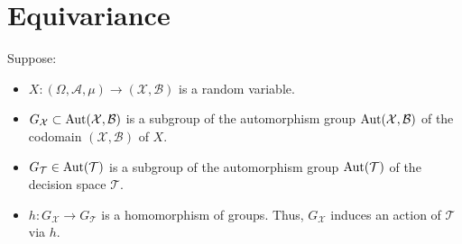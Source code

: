 
\newcommand{\Aut}{\textnormal{Aut}}

\section{Equivariance}
\setcounter{theorem}{0}

\begin{definition}\quad
Suppose:
\begin{itemize}
	\item $X : (\Omega,\mathcal{A},\mu) \longrightarrow (\mathcal{X},\mathcal{B})$ is a random
	      variable.


	\item $G_{\mathcal{X}} \subset \Aut(\mathcal{X},\mathcal{B})$ is a subgroup of the automorphism
	      group $\Aut(\mathcal{X},\mathcal{B})$ of the codomain $(\mathcal{X},\mathcal{B})$ of $X$.


	\item $G_{\mathcal{T}} \in \Aut(\mathcal{T})$ is a subgroup of the automorphism group
	      $\Aut(\mathcal{T})$ of the decision space $\mathcal{T}$.


	\item $h:G_{\mathcal{X}} \longrightarrow G_{\mathcal{T}}$ is a homomorphism of groups.
	      Thus, $G_{\mathcal{X}}$ induces an action of $\mathcal{T}$ via $h$.


\end{itemize}
\end{definition}
